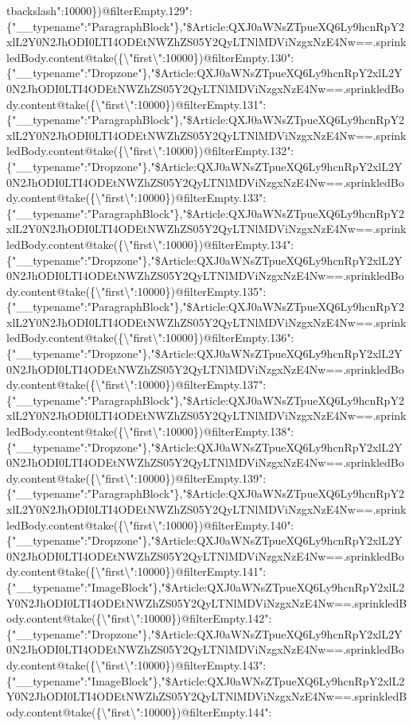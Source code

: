 tbackslash{}":10000\})@filterEmpty.129":\{"\_\_typename":"ParagraphBlock"\},"\$Article:QXJ0aWNsZTpueXQ6Ly9hcnRpY2xlL2Y0N2JhODI0LTI4ODEtNWZhZS05Y2QyLTNlMDViNzgxNzE4Nw==.sprinkledBody.content@take(\{\textbackslash{}"first\textbackslash{}":10000\})@filterEmpty.130":\{"\_\_typename":"Dropzone"\},"\$Article:QXJ0aWNsZTpueXQ6Ly9hcnRpY2xlL2Y0N2JhODI0LTI4ODEtNWZhZS05Y2QyLTNlMDViNzgxNzE4Nw==.sprinkledBody.content@take(\{\textbackslash{}"first\textbackslash{}":10000\})@filterEmpty.131":\{"\_\_typename":"ParagraphBlock"\},"\$Article:QXJ0aWNsZTpueXQ6Ly9hcnRpY2xlL2Y0N2JhODI0LTI4ODEtNWZhZS05Y2QyLTNlMDViNzgxNzE4Nw==.sprinkledBody.content@take(\{\textbackslash{}"first\textbackslash{}":10000\})@filterEmpty.132":\{"\_\_typename":"Dropzone"\},"\$Article:QXJ0aWNsZTpueXQ6Ly9hcnRpY2xlL2Y0N2JhODI0LTI4ODEtNWZhZS05Y2QyLTNlMDViNzgxNzE4Nw==.sprinkledBody.content@take(\{\textbackslash{}"first\textbackslash{}":10000\})@filterEmpty.133":\{"\_\_typename":"ParagraphBlock"\},"\$Article:QXJ0aWNsZTpueXQ6Ly9hcnRpY2xlL2Y0N2JhODI0LTI4ODEtNWZhZS05Y2QyLTNlMDViNzgxNzE4Nw==.sprinkledBody.content@take(\{\textbackslash{}"first\textbackslash{}":10000\})@filterEmpty.134":\{"\_\_typename":"Dropzone"\},"\$Article:QXJ0aWNsZTpueXQ6Ly9hcnRpY2xlL2Y0N2JhODI0LTI4ODEtNWZhZS05Y2QyLTNlMDViNzgxNzE4Nw==.sprinkledBody.content@take(\{\textbackslash{}"first\textbackslash{}":10000\})@filterEmpty.135":\{"\_\_typename":"ParagraphBlock"\},"\$Article:QXJ0aWNsZTpueXQ6Ly9hcnRpY2xlL2Y0N2JhODI0LTI4ODEtNWZhZS05Y2QyLTNlMDViNzgxNzE4Nw==.sprinkledBody.content@take(\{\textbackslash{}"first\textbackslash{}":10000\})@filterEmpty.136":\{"\_\_typename":"Dropzone"\},"\$Article:QXJ0aWNsZTpueXQ6Ly9hcnRpY2xlL2Y0N2JhODI0LTI4ODEtNWZhZS05Y2QyLTNlMDViNzgxNzE4Nw==.sprinkledBody.content@take(\{\textbackslash{}"first\textbackslash{}":10000\})@filterEmpty.137":\{"\_\_typename":"ParagraphBlock"\},"\$Article:QXJ0aWNsZTpueXQ6Ly9hcnRpY2xlL2Y0N2JhODI0LTI4ODEtNWZhZS05Y2QyLTNlMDViNzgxNzE4Nw==.sprinkledBody.content@take(\{\textbackslash{}"first\textbackslash{}":10000\})@filterEmpty.138":\{"\_\_typename":"Dropzone"\},"\$Article:QXJ0aWNsZTpueXQ6Ly9hcnRpY2xlL2Y0N2JhODI0LTI4ODEtNWZhZS05Y2QyLTNlMDViNzgxNzE4Nw==.sprinkledBody.content@take(\{\textbackslash{}"first\textbackslash{}":10000\})@filterEmpty.139":\{"\_\_typename":"ParagraphBlock"\},"\$Article:QXJ0aWNsZTpueXQ6Ly9hcnRpY2xlL2Y0N2JhODI0LTI4ODEtNWZhZS05Y2QyLTNlMDViNzgxNzE4Nw==.sprinkledBody.content@take(\{\textbackslash{}"first\textbackslash{}":10000\})@filterEmpty.140":\{"\_\_typename":"Dropzone"\},"\$Article:QXJ0aWNsZTpueXQ6Ly9hcnRpY2xlL2Y0N2JhODI0LTI4ODEtNWZhZS05Y2QyLTNlMDViNzgxNzE4Nw==.sprinkledBody.content@take(\{\textbackslash{}"first\textbackslash{}":10000\})@filterEmpty.141":\{"\_\_typename":"ImageBlock"\},"\$Article:QXJ0aWNsZTpueXQ6Ly9hcnRpY2xlL2Y0N2JhODI0LTI4ODEtNWZhZS05Y2QyLTNlMDViNzgxNzE4Nw==.sprinkledBody.content@take(\{\textbackslash{}"first\textbackslash{}":10000\})@filterEmpty.142":\{"\_\_typename":"Dropzone"\},"\$Article:QXJ0aWNsZTpueXQ6Ly9hcnRpY2xlL2Y0N2JhODI0LTI4ODEtNWZhZS05Y2QyLTNlMDViNzgxNzE4Nw==.sprinkledBody.content@take(\{\textbackslash{}"first\textbackslash{}":10000\})@filterEmpty.143":\{"\_\_typename":"ImageBlock"\},"\$Article:QXJ0aWNsZTpueXQ6Ly9hcnRpY2xlL2Y0N2JhODI0LTI4ODEtNWZhZS05Y2QyLTNlMDViNzgxNzE4Nw==.sprinkledBody.content@take(\{\textbackslash{}"first\textbackslash{}":10000\})@filterEmpty.144":\